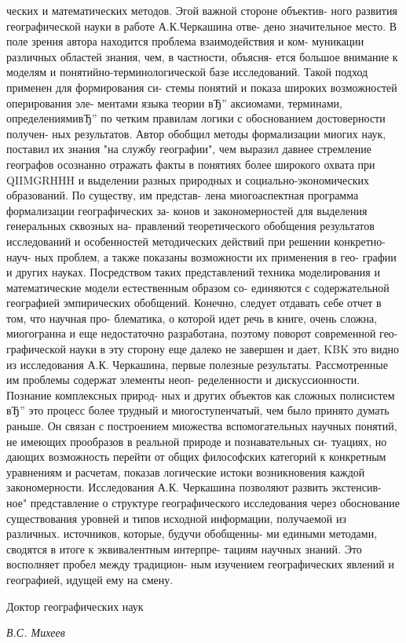 \documentclass[12pt,draft,openany]{extbook}
\begin{document}
ческих и математических методов. Эгой важной стороне объектив-
ного развития географической науки в работе А.К.Черкашина отве-
дено значительное место.
В поле зрения автора находится проблема взаимодействия и ком-
муникации различных областей знания, чем, в частности, объясня-
ется большое внимание к моделям и понятийно-терминологической
базе исследований. Такой подход применен для формирования си-
стемы понятий и показа широких возможностей оперирования эле-
ментами языка теории вЂ” аксиомами, терминами, определениямивЂ”
по четким правилам логики с обоснованием достоверности получен-
ных результатов. Автор обобщил методы формализации миогих наук,
поставил их знания "на службу географии", чем выразил давнее
стремление географов осознанно отражать факты в понятиях более
широкого охвата при QIIMGRHHH и выделении разных природных и
социально-экономических образований. По существу, им представ-
лена миогоаспектная программа формализации географических за-
конов и закономерностей для выделения генеральных сквозных на-
правлений теоретического обобщения результатов исследований и
особенностей методических действий при решении конкретно-науч-
ных проблем, а также показаны возможности их применения в гео-
графии и других науках. Посредством таких представлений техника
моделирования и математические модели естественным образом со-
единяются с содержательной географией эмпирических обобщений.
Конечно, следует отдавать себе отчет в том, что научная про-
блематика, о которой идет речь в книге, очень сложна, миогогранна
и еще недостаточно разработана, поэтому поворот современной гео-
графической науки в эту сторону еще далеко не завершен и дает,
KBK это видно из исследования А.К. Черкашина, первые полезные
результаты. Рассмотренные им проблемы содержат элементы неоп-
ределенности и дискуссионности. Познание комплексных природ-
ных и других объектов как сложных полисистем вЂ” это процесс более
трудный и миогоступенчатый, чем было принято думать раньше. Он
связан с построением миожества вспомогательных научных понятий,
не имеющих прообразов в реальной природе и познавательных си-
туациях, но дающих возможность перейти от общих философских
категорий к конкретным уравнениям и расчетам, показав логические
истоки возникновения каждой закономерности.
Исследования А.К. Черкашина позволяют развить экстенсив-
ное" представление о структуре географического исследования через
обоснование существования уровней и типов исходной информации,
получаемой из различных. источников, которые, будучи обобщенны-
ми едиными методами, сводятся в итоге к эквивалентным интерпре-
тациям научных знаний. Это восполняет пробел между традицион-
ным изучением географических явлений и географией, идущей ему
на смену.

\begin{flushright}
\small{}
Доктор географических наук\par{}
\itshape{}
В.С. Михеев
\end{flushright}
\end{document}
